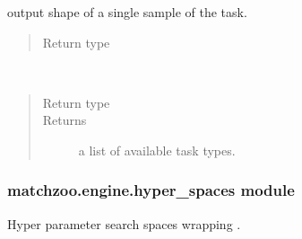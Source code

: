 \documentclass[letterpaper,10pt,english]{sphinxmanual}
\begin{document}
\begin{fulllineitems}
\begin{fulllineitems}
\label{\detokenize{matchzoo.engine:matchzoo.engine.base_task.BaseTask.output_shape}}
 \textendash{} output shape of a single sample of the task.
\begin{quote}\begin{description}
\item[{Return type}] \leavevmode
{}

\end{description}\end{quote}

\end{fulllineitems}


\end{fulllineitems}


\begin{fulllineitems}
\label{\detokenize{matchzoo.engine:matchzoo.engine.base_task.list_available_tasks}}~\begin{quote}\begin{description}
\item[{Return type}] \leavevmode
\sphinxcode{\sphinxupquote{List}}{[}\sphinxcode{\sphinxupquote{Type}}{[}{\hyperref[\detokenize{matchzoo.engine:matchzoo.engine.base_task.BaseTask}]{\sphinxcrossref{\sphinxcode{\sphinxupquote{BaseTask}}}}}{]}{]}

\item[{Returns}] \leavevmode
a list of available task types.

\end{description}\end{quote}

\end{fulllineitems}



\subsubsection{matchzoo.engine.hyper\_spaces module}
\label{\detokenize{matchzoo.engine:module-matchzoo.engine.hyper_spaces}}\label{\detokenize{matchzoo.engine:matchzoo-engine-hyper-spaces-module}}
Hyper parameter search spaces wrapping .
\end{document}
